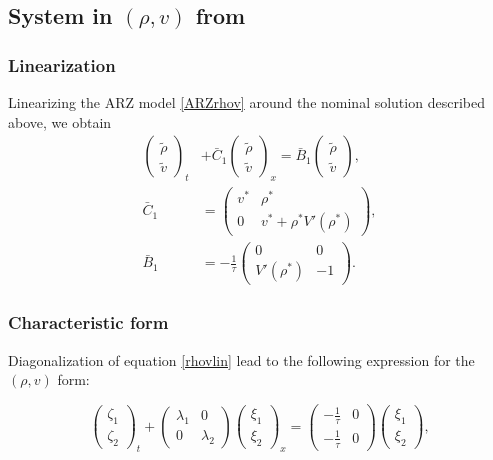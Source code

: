\documentclass[letterpaper, 10 pt, conference]{ieeeconf}  %
\begin{document}
\subsection{System in $(\rho, v)$ from}

\subsubsection{Linearization}
Linearizing the ARZ model \eqref{ARZrhov} around the nominal solution described above, we obtain
{\footnotesize
\begin{subequations} \label{rhovlin}
\begin{align}
\begin{pmatrix}
	\tilde{\rho} \\
	\tilde{v}
\end{pmatrix}_t
&+ \bar{C}_1
\begin{pmatrix}
	\tilde{\rho} \\ 
	\tilde{v}
\end{pmatrix}_x 
= 
\bar{B}_1
\begin{pmatrix}
	\tilde{\rho} \\
	\tilde{v}
\end{pmatrix}, \\
\bar{C}_1
&= 
\begin{pmatrix}
	v^* & \rho^* \\
	0 & v^* + \rho^* V' ( \rho^*) 
\end{pmatrix}, \\
\bar{B}_1 
&= 
-\frac{1}{\tau}
\begin{pmatrix}
	0 & 0 \\
	V'\left( \rho^{*} \right) & -1
\end{pmatrix}.
\end{align}
\end{subequations}
}

\subsubsection{Characteristic form}
Diagonalization of equation \eqref{rhovlin} lead to the following expression for the $\left( \rho, v \right)$ form:

{\footnotesize
\begin{equation}
\begin{pmatrix}
	\zeta_1 \\ 
	\zeta_2
\end{pmatrix}_t
+ 
\begin{pmatrix}
	\lambda_1 & 0 
	\\
	0 & \lambda_2 
\end{pmatrix}
\begin{pmatrix}
	\xi_1 \\ 
	\xi_2
\end{pmatrix}_x
= 
\begin{pmatrix}
	-\frac{1}{\tau} & 0 \\
	-\frac{1}{\tau} & 0
\end{pmatrix}
\begin{pmatrix}
\xi_1 \\ \xi_2
\end{pmatrix},
\end{equation}
}
\end{document}
